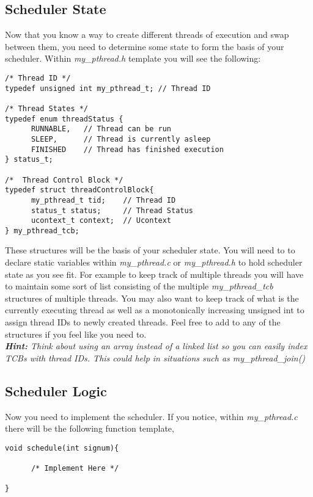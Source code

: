 \documentclass{article}
\begin{document}
\subsection{Scheduler State}
Now that you know a way to create different threads of execution and swap between them, you need to determine some state to form the basis of your scheduler. Within \textit{my\_pthread.h} template you will see the following:

\begin{verbatim}
/* Thread ID */
typedef unsigned int my_pthread_t; // Thread ID

/* Thread States */
typedef enum threadStatus {
      RUNNABLE,   // Thread can be run
      SLEEP,      // Thread is currently asleep
      FINISHED    // Thread has finished execution
} status_t;

/*  Thread Control Block */
typedef struct threadControlBlock{
      my_pthread_t tid;    // Thread ID
      status_t status;     // Thread Status
      ucontext_t context;  // Ucontext
} my_pthread_tcb;
\end{verbatim}

\noindent These structures will be the basis of your scheduler state. You will need to to declare static variables within \textit{my\_pthread.c} or \textit{my\_pthread.h} to hold scheduler state as you see fit. For example to keep track of multiple threads you will have to maintain some sort of list consisting of the multiple \textit{my\_pthread\_tcb} structures of multiple threads. You may also want to keep track of what is the currently executing thread as well as a monotonically increasing unsigned int to assign thread IDs to newly created threads. Feel free to add to any of the structures if you feel like you need to.\\

\noindent \textit{\textbf{Hint:} Think about using an array instead of a linked list so you can easily index TCBs with thread IDs. This could help in situations such as my\_pthread\_join()}



\subsection{Scheduler Logic}
Now you need to implement the scheduler. If you notice, within \textit{my\_pthread.c} there will be the following function template,

\begin{verbatim}
void schedule(int signum){

      /* Implement Here */

}
\end{verbatim}
\end{document}
